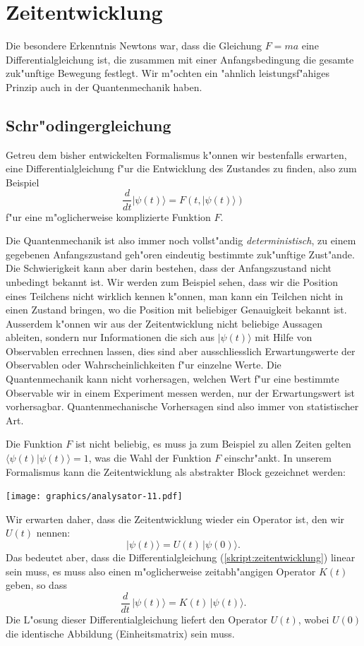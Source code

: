 \section{Zeitentwicklung}
%
Die besondere Erkenntnis Newtons war, dass die Gleichung $F=ma$ eine
Differentialgleichung ist, die zusammen mit einer Anfangsbedingung die
gesamte zuk"unftige Bewegung festlegt.
Wir m"ochten ein "ahnlich leistungsf"ahiges Prinzip auch in der
Quantenmechanik haben.

\subsection{Schr"odingergleichung}
Getreu dem bisher entwickelten Formalismus k"onnen wir bestenfalls
erwarten, eine Differentialgleichung f"ur die Entwicklung des Zustandes
zu finden, also zum Beispiel
\begin{equation}
\frac{d}{dt}|\psi(t)\rangle = F(t, |\psi(t)\rangle)
\label{skript:zeitentwicklung}
\end{equation}
f"ur eine m"oglicherweise komplizierte Funktion $F$.

Die Quantenmechanik ist also immer noch vollst"andig {\em deterministisch},
zu einem gegebenen Anfangszustand geh"oren eindeutig bestimmte
zuk"unftige Zust"ande.
Die Schwierigkeit kann aber darin bestehen, dass der Anfangszustand nicht
unbedingt bekannt ist.
Wir werden zum Beispiel sehen, dass wir die Position eines Teilchens
nicht wirklich kennen k"onnen, man kann ein Teilchen nicht in
einen Zustand bringen, wo die Position mit beliebiger Genauigkeit
bekannt ist.
Ausserdem k"onnen wir aus der Zeitentwicklung nicht beliebige Aussagen
ableiten, sondern nur Informationen die sich aus $|\psi(t)\rangle$ 
mit Hilfe von Observablen errechnen lassen,
dies sind aber ausschliesslich Erwartungswerte der Observablen oder
Wahrscheinlichkeiten f"ur einzelne Werte.
Die Quantenmechanik kann nicht vorhersagen, welchen Wert f"ur eine
bestimmte Observable wir in einem Experiment messen werden,
nur der Erwartungswert ist vorhersagbar.
Quantenmechanische Vorhersagen sind also immer von statistischer Art.


Die Funktion $F$ ist nicht beliebig, es muss ja zum Beispiel zu allen Zeiten
gelten
$\langle\psi(t)|\psi(t)\rangle=1$, was die Wahl der Funktion $F$ einschr"ankt.
In unserem Formalismus kann die Zeitentwicklung als abstrakter Block
gezeichnet werden:
\begin{center}
\texttt{[image: graphics/analysator-11.pdf]}
\end{center}
Wir erwarten daher, dass die Zeitentwicklung wieder ein Operator ist,
den wir $U(t)$ nennen:
\[
|\psi(t)\rangle = U(t)\,|\psi(0)\rangle.
\]
Das bedeutet aber, dass die Differentialgleichung (\ref{skript:zeitentwicklung})
linear sein muss, es muss also einen m"oglicherweise zeitabh"angigen
Operator $K(t)$ geben, so dass 
\begin{equation}
\frac{d}{dt}\,|\psi(t)\rangle = K(t)\,|\psi(t)\rangle.
\label{skript:zeitentwicklung-linear}
\end{equation}
Die L"osung dieser Differentialgleichung liefert den Operator $U(t)$,
wobei $U(0)$ die identische Abbildung (Einheitsmatrix) sein muss.

